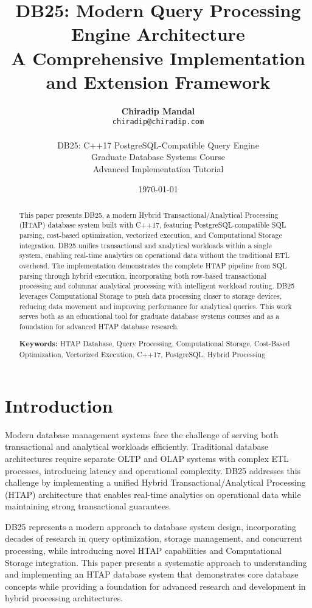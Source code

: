 \documentclass[12pt,a4paper]{article}
\title{\textbf{DB25: Modern Query Processing Engine Architecture \\
A Comprehensive Implementation and Extension Framework}}
\author{
    \textbf{Chiradip Mandal} \\
    \texttt{chiradip@chiradip.com} \\
    \\
    DB25: C++17 PostgreSQL-Compatible Query Engine \\
    Graduate Database Systems Course \\
    Advanced Implementation Tutorial
}
\date{\today}
\begin{document}
    \maketitle

    \begin{abstract}
        This paper presents DB25, a modern Hybrid Transactional/Analytical Processing (HTAP) database system built with C++17, featuring PostgreSQL-compatible SQL parsing, cost-based optimization, vectorized execution, and Computational Storage integration. DB25 unifies transactional and analytical workloads within a single system, enabling real-time analytics on operational data without the traditional ETL overhead. The implementation demonstrates the complete HTAP pipeline from SQL parsing through hybrid execution, incorporating both row-based transactional processing and columnar analytical processing with intelligent workload routing. DB25 leverages Computational Storage to push data processing closer to storage devices, reducing data movement and improving performance for analytical queries. This work serves both as an educational tool for graduate database systems courses and as a foundation for advanced HTAP database research.

        \textbf{Keywords:} HTAP Database, Query Processing, Computational Storage, Cost-Based Optimization, Vectorized Execution, C++17, PostgreSQL, Hybrid Processing
    \end{abstract}

    \tableofcontents
    \newpage

    \section{Introduction}

    Modern database management systems face the challenge of serving both transactional and analytical workloads efficiently. Traditional database architectures require separate OLTP and OLAP systems with complex ETL processes, introducing latency and operational complexity. DB25 addresses this challenge by implementing a unified Hybrid Transactional/Analytical Processing (HTAP) architecture that enables real-time analytics on operational data while maintaining strong transactional guarantees.

    DB25 represents a modern approach to database system design, incorporating decades of research in query optimization, storage management, and concurrent processing, while introducing novel HTAP capabilities and Computational Storage integration. This paper presents a systematic approach to understanding and implementing an HTAP database system that demonstrates core database concepts while providing a foundation for advanced research and development in hybrid processing architectures.
\end{document}
